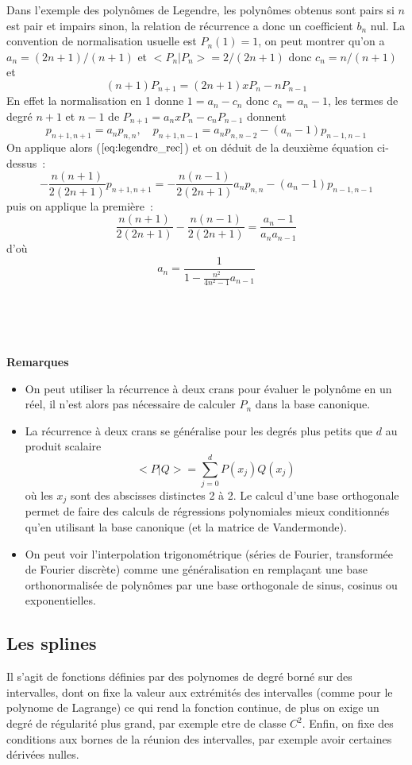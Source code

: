 \documentclass[a4paper,11pt]{article}
\begin{document}
\begin{giacjshere}
Dans l'exemple des polyn\^omes de Legendre, les polyn\^omes obtenus
sont pairs si $n$ est pair et impairs sinon, la relation de 
r\'ecurrence a donc un coefficient $b_n$ nul. La convention
de normalisation usuelle est $P_n(1)=1$, on peut montrer qu'on a
$a_n=(2n+1)/(n+1)$ et $<P_n|P_n>=2/(2n+1)$ 
donc $c_n=n/(n+1)$ et
$$ (n+1)P_{n+1}=(2n+1)xP_n-nP_{n-1} $$
En effet la normalisation en 1 donne $1=a_n-c_n$ donc $c_n=a_n-1$,
les termes de degr\'e $n+1$ et $n-1$ de $P_{n+1}=a_nxP_n-c_nP_{n-1}$ donnent
$$ p_{n+1,n+1}=a_np_{n,n}, \quad p_{n+1,n-1}=a_n
p_{n,n-2}-(a_n-1)p_{n-1,n-1}$$
On applique alors (\(\ref{eq:legendre_rec}\)) et on d\'eduit de la
deuxi\`eme \'equation ci-dessus~:
$$ -\frac{n(n+1)}{2(2n+1)} p_{n+1,n+1}= -\frac{n(n-1)}{2(2n+1)} a_n
p_{n,n}-(a_n-1)p_{n-1,n-1}$$
puis on applique la premi\`ere~:
$$ \frac{n(n+1)}{2(2n+1)} -
\frac{n(n-1)}{2(2n+1)}=\frac{a_n-1}{a_na_{n-1}}$$
d'o\`u 
$$ a_n=\frac{1}{1-\frac{n^2}{4n^2-1} a_{n-1}}$$



\\
\\
\\

{\bf Remarques}
\begin{itemize}
\item On peut utiliser la r\'ecurrence \`a deux crans pour \'evaluer
le polyn\^ome en un r\'eel, il n'est alors pas n\'ecessaire
de calculer $P_n$ dans la base canonique.
\item La r\'ecurrence \`a deux crans se g\'en\'eralise pour les degr\'es
plus petits que $d$ au produit scalaire
$$ <P|Q>=\sum_{j=0}^d P(x_j) Q(x_j) $$
o\`u les $x_j$ sont des abscisses distinctes 2 \`a 2. Le calcul
d'une base orthogonale permet de
faire des calculs de r\'egressions polynomiales mieux conditionn\'es
qu'en utilisant la base canonique (et la matrice de Vandermonde).
\item
On peut voir l'interpolation trigonom\'etrique (s\'eries de Fourier,
transform\'ee de Fourier discr\`ete) comme une
g\'en\'eralisation en rempla\c{c}ant une base orthonormalis\'ee
de polyn\^omes par une base orthogonale de sinus, cosinus
ou exponentielles.
\end{itemize}

\subsection{Les splines}
Il s'agit de fonctions définies par des polynomes de degré borné
sur des intervalles, dont on fixe la valeur
aux extrémités des intervalles (comme pour le polynome de Lagrange)
ce qui rend la fonction continue, de plus on exige un
degré de régularité plus grand, par exemple etre de classe $C^2$.
Enfin, on fixe des conditions aux bornes de la réunion des 
intervalles, par exemple avoir certaines dérivées nulles. 


\end{giacjshere}
\end{document}
